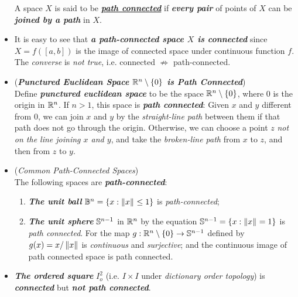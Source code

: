 \documentclass[11pt]{article}
\begin{document}
\begin{itemize}
\begin{definition}
A space $X$ is said to be \underline{\emph{\textbf{path connected}}} if \emph{\textbf{every pair}} of points of $X$ can be \emph{\textbf{joined by a path}} in $X$.
\end{definition}

\item \begin{remark}
It is easy to see that \emph{\textbf{a path-connected space $X$ is connected}} since $X = f([a,b])$ is the image of connected space under continuous function $f$. The \emph{converse} is \emph{not true}, i.e. connected $\not\Rightarrow$ path-connected.
\end{remark}

\item \begin{example} (\emph{\textbf{Punctured Euclidean Space ${\mathbb R}^n \setminus \left\{0\right\}$ is Path Connected}})\\
Define \emph{\textbf{punctured euclidean space}} to be the space ${\mathbb R}^n \setminus \left\{0\right\}$, where $0$ is the origin in ${\mathbb R}^n$. If $n > 1$, this space is \emph{\textbf{path connected}}: Given $x$ and $y$ different from $0$, we can join $x$ and $y$ by the \emph{straight-line path} between them if that path does not go through
the origin. Otherwise, we can choose a point $z$ \emph{not on the line joining $x$ and $y$}, and take the \emph{broken-line path} from $x$ to $z$, and then from $z$ to $y$.
\end{example}

\item 
\begin{example} (\emph{Common Path-Connected Spaces})\\
The following spaces are \emph{\textbf{path-connected}}:
\begin{enumerate}
\item \emph{\textbf{The unit ball}} ${\mathbb B}^n = \left\{x: \left\|x\right\|_{} \le 1\right\}$ is \emph{path-connected};
\item \emph{\textbf{The unit sphere}} ${\mathbb S}^{n-1}$ in ${\mathbb R}^n$ by the equation ${\mathbb S}^{n-1} = \left\{x: \left\|x\right\|_{} = 1\right\}$ is \emph{path connected}. For the map $g : {\mathbb R}^n \setminus \left\{0\right\}\rightarrow {\mathbb S}^{n-1}$ defined by $g(x)= x/\left\|x\right\|_{}$ is \textit{continuous} and \emph{surjective}; and the continuous image of path connected space is path connected.
\end{enumerate}
\end{example}


\item \begin{example}
\emph{\textbf{The ordered square}} $I_o^2$ (i.e. $I \times I$ under \emph{dictionary order topology}) is \emph{\textbf{connected}} but \emph{\textbf{not path connected}}.
\end{example}


\end{itemize}
\end{document}
